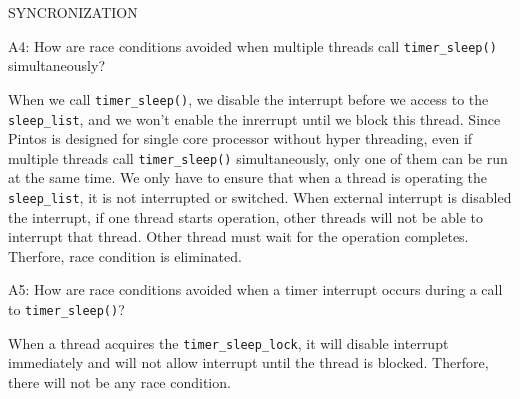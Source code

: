 \begin{aspect}{SYNCRONIZATION}
	\begin{qc}
		A4: How are race conditions avoided when multiple threads call \lstinline{timer_sleep()} simultaneously?
	\end{qc}
	When we call \lstinline{timer_sleep()}, we disable the interrupt before we access to the \lstinline{sleep_list}, and we won't enable the inrerrupt until we block this thread. Since Pintos is designed for single core processor without hyper threading, even if multiple threads call \lstinline{timer_sleep()} simultaneously, only one of them can be run at the same time. We only have to ensure that when a thread is operating the \lstinline{sleep_list}, it is not interrupted or switched. When external interrupt is disabled the interrupt, if one thread starts operation, other threads will not be able to interrupt that thread. Other thread must wait for the operation completes. Therfore, race condition is eliminated.
	\begin{qc}
		A5: How are race conditions avoided when a timer interrupt occurs during a call to \lstinline{timer_sleep()}?
	\end{qc}
	When a thread acquires the \lstinline{timer_sleep_lock}, it will disable interrupt immediately and will not allow interrupt until the thread is blocked. Therfore, there will not be any race condition.
\end{aspect}


